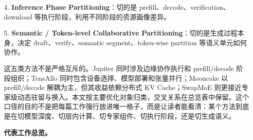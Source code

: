 \documentclass[a4paper,twocolumn,10pt]{ctexart}
\begin{document}
4. \textbf{Inference Phase Partitioning}：切的是 prefill、decode、verification、download 等执行阶段，利用不同阶段的资源画像差异。


5. \textbf{Semantic / Token-level Collaborative Partitioning}：切的是生成过程本身，决定 draft、verify、semantic segment、token-wise partition 等语义单元如何协作。


这五类方法不是严格互斥的。Jupiter 同时涉及边缘协作执行和 prefill/decode 阶段组织；TensAllo 同时包含设备选择、模型部署和张量并行；Mooncake 以 prefill/decode 解耦为主，但其收益依赖分布式 KV Cache；SwapMoE 则更接近专家级动态驻留与换入。本文按主要优化对象归类，交叉关系在总览表中保留。这个口径的目的不是把每篇工作强行放进唯一格子，而是让读者能看清：某个方法到底是在切模型深度、切层内计算、切专家组件、切执行阶段，还是切生成语义。


\textbf{代表工作总览。}
\end{document}
